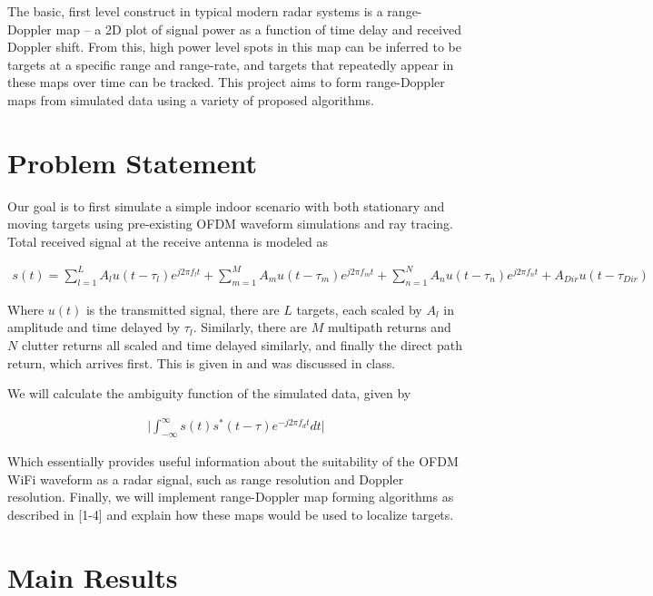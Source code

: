 \documentclass[article,11pt,onecolumn,final]{IEEEtran}
\begin{document}
The basic, first level construct in typical modern radar systems is a range-Doppler map -- a 2D plot of
signal power as a function of time delay and received Doppler shift. From this, high power level spots in
this map can be inferred to be targets at a specific range and range-rate, and targets that repeatedly
appear in these maps over time can be tracked. This project aims to form range-Doppler maps from
simulated data using a variety of proposed algorithms.

\section{Problem Statement} 
Our goal is to first simulate a simple indoor scenario with both stationary and moving targets using 
pre-existing OFDM waveform simulations and ray tracing. Total received signal at the receive antenna is modeled as

\begin{align*}
 s(t) = \sum_{l=1}^L A_l u(t-\tau_l)e^{j 2 \pi f_l t} + \sum_{m=1}^M A_m u(t-\tau_m)e^{j 2\pi f_m t} +
        \sum_{n=1}^N A_n u(t-\tau_n)e^{j 2 \pi f_n t} + A_{Dir} u(t-\tau_{Dir})
\end{align*}

Where $u(t)$ is the transmitted signal, there are $L$ targets, each scaled by $A_l$ in amplitude and time
delayed by $\tau_l$. Similarly, there are $M$ multipath returns and $N$ clutter returns all scaled and time delayed similarly, and finally the direct path return, which arrives first. This is given in \cite{Chetty} and was discussed in class.

We will calculate the ambiguity function of the simulated data, given by

\begin{align*}
\big|\int_{-\infty}^{\infty} s(t)s^*(t-\tau)e^{-j2\pi f_d t}dt \big|
\end{align*}

Which essentially provides useful information about the suitability of the OFDM WiFi waveform as a
radar signal, such as range resolution and Doppler resolution. Finally, we will implement range-Doppler
map forming algorithms as described in [1-4] and explain how these maps would be used to localize
targets.


\section{Main Results}
\end{document}
